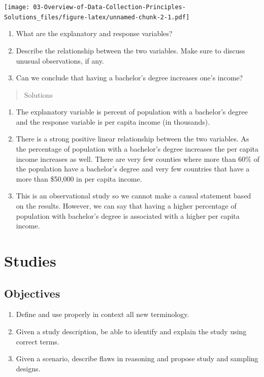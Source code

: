 \documentclass[
]{book}
\providecommand{\tightlist}{%
  \setlength{\itemsep}{0pt}\setlength{\parskip}{0pt}}
\begin{document}
\texttt{[image: 03-Overview-of-Data-Collection-Principles-Solutions\_files/figure-latex/unnamed-chunk-2-1.pdf]}

\begin{enumerate}
\def\labelenumi{\alph{enumi}.}
\tightlist
\item
  What are the explanatory and response variables?
\item
  Describe the relationship between the two variables. Make sure to discuss unusual observations, if any.
\item
  Can we conclude that having a bachelor's degree increases one's income?
\end{enumerate}

\begin{quote}
Solutions
\end{quote}

\begin{enumerate}
\def\labelenumi{\alph{enumi}.}
\tightlist
\item
  The explanatory variable is percent of population with a bachelor's degree and the response variable is per capita income (in thousands).
\item
  There is a strong positive linear relationship between the two variables. As the percentage of population with a bachelor's degree increases the per capita income increases as well. There are very few counties where more than 60\% of the population have a bachelor's degree and very few countries that have a more than \$50,000 in per capita income.
\item
  This is an observational study so we cannot make a causal statement based on the results. However, we can say that having a higher percentage of population with bachelor's degree is associated with a higher per capita income.
\end{enumerate}

\hypertarget{STUDY}{%
\chapter{Studies}\label{STUDY}}

\hypertarget{objectives-3}{%
\section{Objectives}\label{objectives-3}}

\begin{enumerate}
\def\labelenumi{\arabic{enumi})}
\tightlist
\item
  Define and use properly in context all new terminology.\\
\item
  Given a study description, be able to identify and explain the study using correct terms.\\
\item
  Given a scenario, describe flaws in reasoning and propose study and sampling designs.
\end{enumerate}
\end{document}
